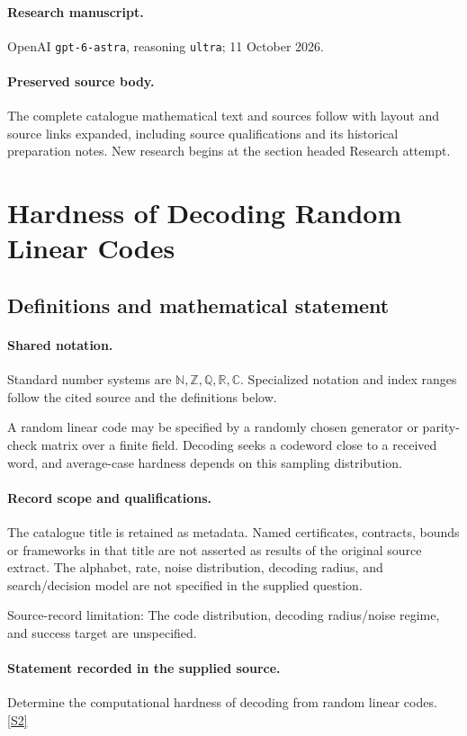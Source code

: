\documentclass[11pt]{article}
\begin{document}
\paragraph{Research manuscript.} OpenAI \texttt{gpt-6-astra}, reasoning \texttt{ultra}; 11 October 2026.
\paragraph{Preserved source body.} The complete catalogue mathematical text and sources follow with layout and source links expanded, including source qualifications and its historical preparation notes. New research begins at the section headed Research attempt.

\section{Hardness of Decoding Random Linear Codes}\label{statement}

\subsection{Definitions and mathematical statement}

\paragraph{Shared notation.}Standard number systems are $\mathbb N,\mathbb Z,\mathbb Q,\mathbb R,\mathbb C$. Specialized notation and index ranges follow the cited source and the definitions below.


A random linear code may be specified by a randomly chosen generator or parity-check matrix over a finite field. Decoding seeks a codeword close to a received word, and average-case hardness depends on this sampling distribution.
\paragraph{Record scope and qualifications.}
The catalogue title is retained as metadata. Named certificates, contracts, bounds or frameworks in that title are not asserted as results of the original source extract.
The alphabet, rate, noise distribution, decoding radius, and search/decision model are not specified in the supplied question.

Source-record limitation: The code distribution, decoding radius/noise regime, and success target are unspecified.
\paragraph{Statement recorded in the supplied source.}
Determine the computational hardness of decoding from random linear codes. \href{https://doi.org/10.4171/owr/2005/26}{[S2]}
\end{document}

